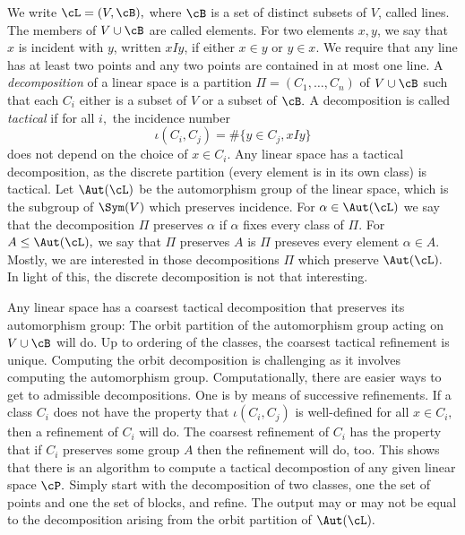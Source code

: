 We write $\cL=(V,\cB),$ where $\cB$ is a set of distinct subsets of $V$, called lines. 
The members of $V \cup \cB$ are called elements. 
For two elements $x,y$, we say that $x$ is incident with $y$, written $xIy$, 
if either $x \in y$ or $y \in x.$
We require that any line has at least two points 
and any two points are contained in at most one line. 
A {\em decomposition} of a linear space is a partition $\Pi= (C_1,\ldots,C_n)$ of $V \cup \cB$ 
such that each $C_i$ either is a subset of $V$ or a subset of $\cB.$
A decomposition is called {\em tactical} if for all $i,$ the incidence number 
$$
\iota(C_i,C_j) = \# \{y \in C_j, xIy\}
$$
does not depend on the choice of $x \in C_i.$
Any linear space has a tactical decomposition, 
as the discrete partition (every element is in its own class) 
is tactical. 
Let $\Aut(\cL)$ be the automorphism group of the linear space, which is the subgroup of 
$\Sym(V)$ which preserves incidence. 
For $\alpha \in \Aut(\cL)$ we say that 
the decomposition $\Pi$ preserves $\alpha$ if $\alpha$ fixes every class of $\Pi.$ 
For $A \le  \Aut(\cL),$ we say that $\Pi$ preserves $A$ is $\Pi$ preseves every element $\alpha \in A.$
Mostly, we are interested in those decompositions $\Pi$ which preserve $\Aut(\cL).$
In light of this, the discrete decomposition is not that interesting. 

\bigskip


Any linear space has a coarsest tactical decomposition that preserves its automorphism group: 
The orbit partition of the automorphism group acting on $V \cup \cB$ will do. 
Up to ordering of the classes, the coarsest tactical refinement is unique.
Computing the orbit decomposition is challenging as it involves computing the automorphism group. 
Computationally, there are easier ways to get to admissible decompositions. 
One is by means of successive refinements. 
If a class $C_i$ does not have the property that $\iota(C_i,C_j)$ is well-defined 
for all $x \in C_i,$ then a refinement of $C_i$ will do. 
The coarsest refinement of $C_i$ has the property that 
if $C_i$ preserves some group $A$ then the refinement will do, too.
This shows that there is an algorithm to compute a tactical decompostion of any given linear space $\cP.$ 
Simply start with the decomposition of two classes, one the set of points and one the set of blocks, and refine. 
The output may or may not be equal to the decomposition arising from the orbit partition of $\Aut(\cL).$

\bigskip

